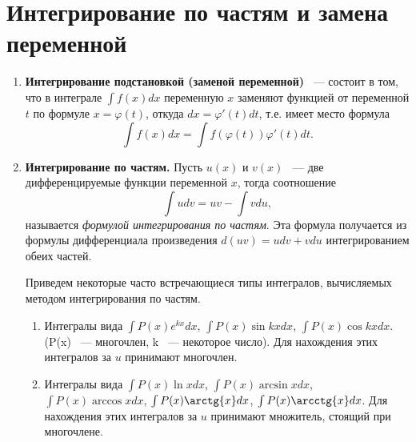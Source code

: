 \documentclass[11pt]{article}
\begin{document}
	\section{Интегрирование по частям и замена переменной}
	\begin{enumerate}
		\item\textbf{Интегрирование подстановкой (заменой переменной)} ~--- состоит в том, что в интеграле $\int{f(x)dx}$ переменную $x$ заменяют функцией от переменной $t$ по формуле $x = \varphi (t)$, откуда $dx = \varphi '(t)dt$, т.е. имеет место формула
		$$
			\int{f(x)dx} = \int{f(\varphi (t))\varphi '(t)dt}.
		$$
		\item\textbf{Интегрирование по частям.} Пусть $u(x)$ и $v(x)$ ~--- две дифференцируемые функции переменной $x$, тогда соотношение
		$$
			\int{udv} = uv - \int{vdu},
		$$
		называется \textit{формулой интегрирования по частям}. Эта формула получается из формулы дифференциала произведения $d(uv) = udv + vdu$ интегрированием обеих частей.

		Приведем некоторые часто встречающиеся типы интегралов, вычисляемых методом интегрирования по частям.
		\begin{enumerate}
			\item Интегралы вида $\int{P(x)e^{kx}dx}$, $\int{P(x)\sin{kx}dx}$, $\int{P(x)\cos{kx}dx}$. (P(x) ~--- многочлен, k ~--- некоторое число).
			Для нахождения этих интегралов за $u$ принимают многочлен.
			\item Интегралы вида $\int{P(x)\ln{x}dx}$, $\int{P(x)\arcsin{x}dx}$, $\int{P(x)\arccos{x}dx}$, $\int{P(x)\arctg{x}dx}$, $\int{P(x)\arcctg{x}dx}$.
			Для нахождения этих интегралов за $u$ принимают множитель, стоящий при многочлене.
		\end{enumerate}
	\end{enumerate}
\end{document}
